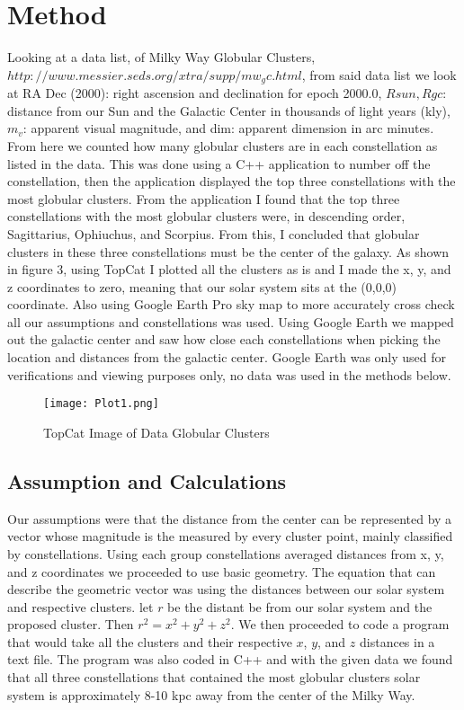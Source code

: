 \documentclass[%
 reprint,
 amsmath,amssymb,
 aps,
]{revtex4-1}
\begin{document}
\section{\label{sec:level2}Method}
Looking at a data list, of Milky Way Globular Clusters, $http://www.messier.seds.org/xtra/supp/mw_gc.html$, from said data list we look at RA Dec (2000): right ascension and declination for epoch 2000.0, $Rsun, Rgc$: distance from our Sun and the Galactic Center in thousands of light years (kly), $m_v$: apparent visual magnitude, and dim: apparent dimension in arc minutes. From here we counted how many globular clusters are in each constellation as listed in the data. This was done using a C++ application to number off the constellation, then the application displayed the top three constellations with the most globular clusters. From the application I found that the top three constellations with the most globular clusters were, in descending order, Sagittarius, Ophiuchus, and Scorpius. From this, I concluded that globular clusters in these three constellations must be the center of the galaxy. As shown in figure 3, using TopCat I plotted all the clusters as is and I made the x, y, and z coordinates to zero, meaning that our solar system sits at the (0,0,0) coordinate. Also using Google Earth Pro sky map to more accurately cross check all our assumptions and constellations was used. Using Google Earth we mapped out the galactic center and saw how close each constellations when picking the location and distances from the galactic center. Google Earth was only used for verifications and viewing purposes only, no data was used in the methods below.

\begin{figure}[htbp] %
   \centering
   \texttt{[image: Plot1.png]} 
   \caption{TopCat Image of Data Globular Clusters}
   \label{fig 3}
\end{figure}

\subsection{\label{sec:level2}Assumption and Calculations}
Our assumptions were that the distance from the center can be represented by a vector whose magnitude is the measured by every cluster point, mainly classified by constellations. Using each group constellations averaged distances from x, y, and z coordinates we proceeded to use basic geometry. The equation that can describe the geometric vector was using the distances between our solar system and respective clusters. let $r$ be the distant be from our solar system and the proposed cluster. Then $r^2 = x^2+y^2+z^2$. We then proceeded to code a program that would take all the clusters and their respective $x$, $y$, and $z$ distances in a text file. The program was also coded in C++ and with the given data we found that all three constellations that contained the most globular clusters solar system is approximately 8-10 kpc away from the center of the Milky Way. 
\end{document}
